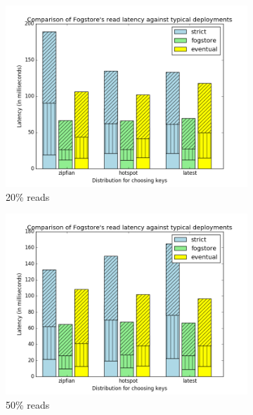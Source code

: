 \begin{figure}[t]
  \centering
  \begin{subfigure}[b]{0.32\linewidth}
    \includegraphics[width=\linewidth]{figures/fogstore/evals/stress-tests/0.2/read.png}
    \caption{20\% reads}
  \end{subfigure}
  \begin{subfigure}[b]{0.32\linewidth}
    \includegraphics[width=\linewidth]{figures/fogstore/evals/stress-tests/0.5/read.png}
    \caption{50\% reads}
  \end{subfigure}
  \begin{subfigure}[b]{0.32\linewidth}

\end{subfigure}
\end{figure}
